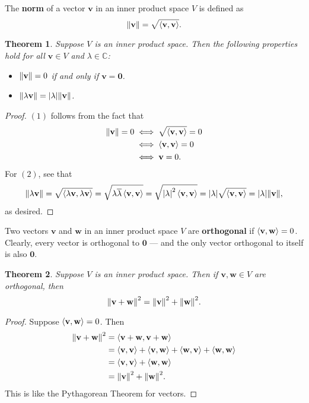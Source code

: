 \documentclass[11pt]{article}
\renewcommand{\vec}[1]{\mathbf{#1}}
\newcommand{\conjugate}[1]{\overline{#1}}
\newtheorem{theorem}{Theorem}
\begin{document}
The \textbf{norm} of a vector $\vec{v}$ in an inner product space $V$ is defined as
\[
	\norm{\vec{v}} = \sqrt{\ev{\vec{v}, \vec{v}}}.
\]
\begin{theorem}
	Suppose $V$ is an inner product space. Then the following properties hold for all $\vec{v} \in V$ and $\lambda \in \mathbb{C}$:
	\begin{itemize}
		\item $\norm{\vec{v}} = 0$ if and only if $\vec{v} = \vec{0}$.
		\item $\norm{\lambda \vec{v}} = \abs{\lambda} \norm{\vec{v}}$.
	\end{itemize}
\end{theorem}
\begin{adjustwidth}{1cm}{}
	\begin{proof}
		$(1)$ follows from the fact that
		\begin{align*}
			\norm{\vec{v}} = 0 &\iff \sqrt{\ev{\vec{v}, \vec{v}}} = 0 \\
			&\iff \ev{\vec{v}, \vec{v}} = 0 \\
			&\iff \vec{v} = 0.
		\end{align*}
		For $(2)$, see that
		\[
			\norm{\lambda \vec{v}} = \sqrt{\ev{\lambda \vec{v}, \lambda \vec{v}}} = \sqrt{\lambda \conjugate{\lambda} \ev{\vec{v}, \vec{v}}} = \sqrt{\abs{\lambda}^{2} \ev{\vec{v}, \vec{v}}} = \abs{\lambda} \sqrt{\ev{\vec{v}, \vec{v}}} = \abs{\lambda} \norm{\vec{v}},
		\]
		as desired.
	\end{proof}
\end{adjustwidth}

Two vectors $\vec{v}$ and $\vec{w}$ in an inner product space $V$ are \textbf{orthogonal} if $\ev{\vec{v}, \vec{w}} = 0$. Clearly, every vector is orthogonal to $\vec{0}$ --- and the only vector orthogonal to itself is also $\vec{0}$.

\begin{theorem}
	Suppose $V$ is an inner product space. Then if $\vec{v}, \vec{w} \in V$ are orthogonal, then
	\[
		\norm{\vec{v} + \vec{w}}^{2} = \norm{\vec{v}}^{2} + \norm{\vec{w}}^{2}.
	\]
\end{theorem}
\begin{adjustwidth}{1cm}{}
	\begin{proof}
		Suppose $\ev{\vec{v}, \vec{w}} = 0$. Then
		\begin{align*}
			\norm{\vec{v} + \vec{w}}^{2} &= \ev{\vec{v} + \vec{w}, \vec{v} + \vec{w}} \\
			&= \ev{\vec{v}, \vec{v}} + \ev{\vec{v}, \vec{w}} + \ev{\vec{w}, \vec{v}} + \ev{\vec{w}, \vec{w}} \\
			&= \ev{\vec{v}, \vec{v}} + \ev{\vec{w}, \vec{w}} \\
			&= \norm{\vec{v}}^{2} + \norm{\vec{w}}^{2}.
		\end{align*}
		This is like the Pythagorean Theorem for vectors.
	\end{proof}
\end{adjustwidth}
\end{document}

